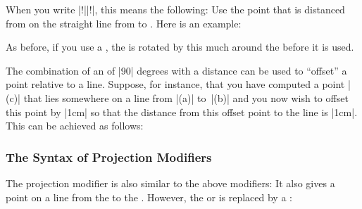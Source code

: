 When you write |!||!|, this means the
following: Use the point that is distanced  from
 on the straight line from  to . Here is an example:
\begin{codeexample}[]
\end{codeexample}

As before, if you use a , the  is
rotated by this much around the  before it is used.

The combination of an  of |90| degrees with a distance can
be used to ``offset'' a point relative to a line. Suppose, for
instance, that you have computed a point |(c)| that lies somewhere on
a line from |(a)| to~|(b)| and you now wish to offset this point by
|1cm| so that the distance from this offset point to the line is
|1cm|. This can be achieved as follows:
\begin{codeexample}[]
\end{codeexample}



\subsubsection{The Syntax of Projection Modifiers}

The projection modifier is also similar to the above modifiers: It also
gives a point on a line from the  to the . However, the  or  is replaced by a
:
\begin{quote}
\end{quote}

